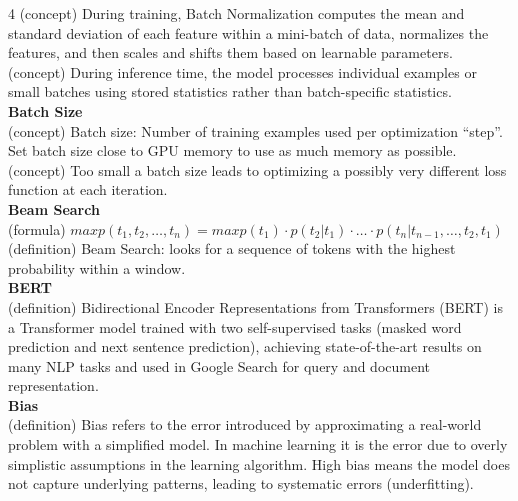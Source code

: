 \documentclass[8pt]{extarticle}
\begin{document}
\begin{multicols}{4}
(concept) During training, Batch Normalization computes the mean and standard deviation of each feature within a mini-batch of data, normalizes the features, and then scales and shifts them based on learnable parameters.\\
(concept) During inference time, the model processes individual examples or small batches using stored statistics rather than batch-specific statistics.\\
\vspace{2pt}\textbf{Batch Size}\\
(concept) Batch size: Number of training examples used per optimization ``step''. Set batch size close to GPU memory to use as much memory as possible.\\
(concept) Too small a batch size leads to optimizing a possibly very different loss function at each iteration.\\
\vspace{2pt}\textbf{Beam Search}\\
(formula) $maxp(t_1, t_2, \dots, t_n) = maxp(t_1) \cdot p(t_2|t_1) \cdot \dots \cdot p(t_n|t_{n-1}, \dots, t_2, t_1)$\\
(definition) Beam Search: looks for a sequence of tokens with the highest probability within a window.\\
\vspace{2pt}\textbf{BERT}\\
(definition) Bidirectional Encoder Representations from Transformers (BERT) is a Transformer model trained with two self-supervised tasks (masked word prediction and next sentence prediction), achieving state-of-the-art results on many NLP tasks and used in Google Search for query and document representation.\\
\vspace{2pt}\textbf{Bias}\\
(definition) Bias refers to the error introduced by approximating a real-world problem with a simplified model. In machine learning it is the error due to overly simplistic assumptions in the learning algorithm. High bias means the model does not capture underlying patterns, leading to systematic errors (underfitting).\\


\end{multicols}
\end{document}
